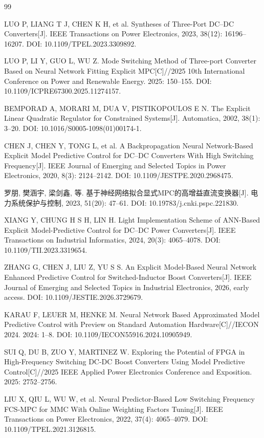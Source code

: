 \documentclass[UTF8,fontset=fandol,a4paper,twocolumn,10pt]{ctexart}
\begin{document}
\balance
\begin{thebibliography}{99}\small\raggedright

 LUO P, LIANG T J, CHEN K H, et al. Syntheses of Three-Port DC–DC Converters[J]. IEEE Transactions on Power Electronics, 2023, 38(12): 16196–16207. DOI: 10.1109/TPEL.2023.3309892.

 LUO P, LI Y, GUO L, WU Z. Mode Switching Method of Three-port Converter Based on Neural Network Fitting Explicit MPC[C]//2025 10th International Conference on Power and Renewable Energy. 2025: 150–155. DOI: 10.1109/ICPRE67300.2025.11274157.

 BEMPORAD A, MORARI M, DUA V, PISTIKOPOULOS E N. The Explicit Linear Quadratic Regulator for Constrained Systems[J]. Automatica, 2002, 38(1): 3–20. DOI: 10.1016/S0005-1098(01)00174-1.

 CHEN J, CHEN Y, TONG L, et al. A Backpropagation Neural Network-Based Explicit Model Predictive Control for DC–DC Converters With High Switching Frequency[J]. IEEE Journal of Emerging and Selected Topics in Power Electronics, 2020, 8(3): 2124–2142. DOI: 10.1109/JESTPE.2020.2968475.

 罗朋, 樊涵宇, 梁剑鑫, 等. 基于神经网络拟合显式MPC的高增益直流变换器[J]. 电力系统保护与控制, 2023, 51(20): 47–61. DOI: 10.19783/j.cnki.pspc.221830.

 XIANG Y, CHUNG H S H, LIN H. Light Implementation Scheme of ANN-Based Explicit Model-Predictive Control for DC–DC Power Converters[J]. IEEE Transactions on Industrial Informatics, 2024, 20(3): 4065–4078. DOI: 10.1109/TII.2023.3319654.

 ZHANG G, CHEN J, LIU Z, YU S S. An Explicit Model-Based Neural Network Enhanced Predictive Control for Switched-Inductor Boost Converters[J]. IEEE Journal of Emerging and Selected Topics in Industrial Electronics, 2026, early access. DOI: 10.1109/JESTIE.2026.3729679.

 KARAU F, LEUER M, HENKE M. Neural Network Based Approximated Model Predictive Control with Preview on Standard Automation Hardware[C]//IECON 2024. 2024: 1–8. DOI: 10.1109/IECON55916.2024.10905949.

 SUI Q, DU B, ZUO Y, MARTINEZ W. Exploring the Potential of FPGA in High-Frequency Switching DC-DC Boost Converters Using Model Predictive Control[C]//2025 IEEE Applied Power Electronics Conference and Exposition. 2025: 2752–2756.

 LIU X, QIU L, WU W, et al. Neural Predictor-Based Low Switching Frequency FCS-MPC for MMC With Online Weighting Factors Tuning[J]. IEEE Transactions on Power Electronics, 2022, 37(4): 4065–4079. DOI: 10.1109/TPEL.2021.3126815.


\end{thebibliography}
\end{document}
